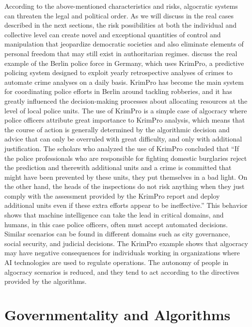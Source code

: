 According to the above-mentioned characteristics and risks, algocratic systems can threaten the legal and political order. As we will discuss in the real cases described in the next sections, the risk possibilities at both the individual and collective level can create novel and exceptional quantities of control and manipulation that jeopardize democratic societies and also eliminate elements of personal freedom that may still exist in authoritarian regimes. \citet{chap:9:Lorenzetal:2021} discuss the real example of the Berlin police force in Germany, which uses KrimPro, a predictive policing system designed to exploit yearly retrospective analyses of crimes to automate crime analyses on a daily basis. KrimPro has become the main system for coordinating police efforts in Berlin around tackling robberies, and it has greatly influenced the decision-making processes about allocating resources at the level of local police units. The use of KrimPro is a simple case of algocracy where police officers attribute great importance to KrimPro analysis, which means that the course of action is generally determined by the algorithmic decision and advice that can only be overruled with great difficulty, and only with additional justification. The scholars who analyzed the use of KrimPro concluded that ``If the police professionals who are responsible for fighting domestic burglaries reject the prediction and therewith additional units and a crime is committed that might have been prevented by these units, they put themselves in a bad light. On the other hand, the heads of the inspections do not risk anything when they just comply with the assessment provided by the KrimPro report and deploy additional units even if these extra efforts appear to be ineffective.'' This behavior shows that machine intelligence can take the lead in critical domains, and humans, in this case police officers, often must accept automated decisions. Similar scenarios can be found in different domains such as city governance, social security, and judicial decisions. The KrimPro example shows that algocracy may have negative consequences for individuals working in organizations where AI technologies are used to regulate operations. The autonomy of people in algocracy scenarios is reduced, and they tend to act according to the directives provided by the algorithms.

\section{\label{sec:9.4}Governmentality and Algorithms}

